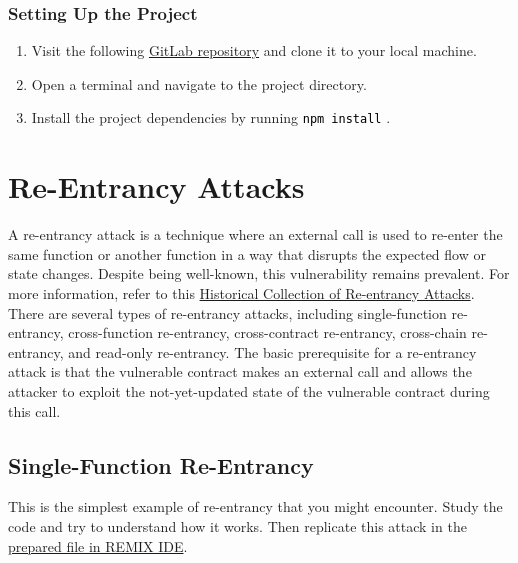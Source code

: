 \documentclass[12pt]{article}
\newcommand{\codegrey}[1]{%
  \texttt{\colorbox{black!4}{\textcolor{black}{#1}}}%
}
\begin{document}
\subsubsection*{Setting Up the Project}

\begin{enumerate}
    \item Visit the following \href{https://gitlab.fel.cvut.cz/radovluk/smart-contracts-exercises/-/tree/main/05-Re-Entrancy/task/task-code}{GitLab repository} and clone it to your local machine.
    \item Open a terminal and navigate to the project directory.
    \item Install the project dependencies by running \codegrey{npm install}.
\end{enumerate}

\section{Re-Entrancy Attacks}

A re-entrancy attack is a technique where an external call is used to re-enter the same function or another function in a way that disrupts the expected flow or state changes. Despite being well-known, this vulnerability remains prevalent. For more information, refer to this \href{https://github.com/pcaversaccio/reentrancy-attacks?tab=readme-ov-file}{Historical Collection of Re-entrancy Attacks}. There are several types of re-entrancy attacks, including single-function re-entrancy, cross-function re-entrancy, cross-contract re-entrancy, cross-chain re-entrancy, and read-only re-entrancy. The basic prerequisite for a re-entrancy attack is that the vulnerable contract makes an external call and allows the attacker to exploit the not-yet-updated state of the vulnerable contract during this call.

\subsection{Single-Function Re-Entrancy}

This is the simplest example of re-entrancy that you might encounter. Study the code and try to understand how it works. Then replicate this attack in the \href{https://remix.ethereum.org/?#activate=solidity&url=https://github.com/radovluk/unbreakable-vault/contracts/reentrancy01.sol&lang=en&optimize=false&runs=200&evmVersion=null&version=soljson-v0.8.28+commit.7893614a.js}{prepared file in REMIX IDE}.
\end{document}
